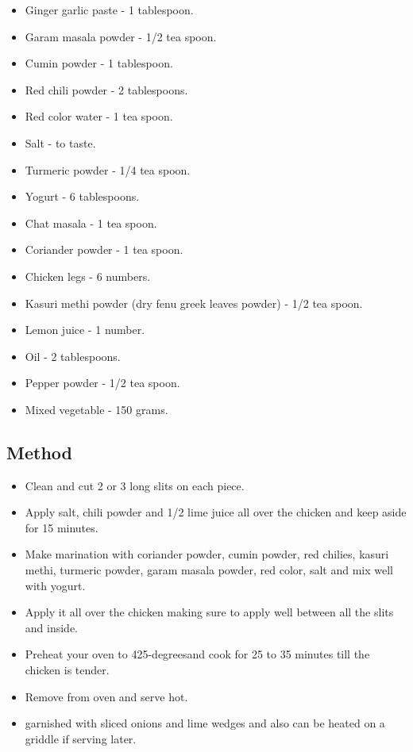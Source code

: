 \documentclass[]{article}
\providecommand{\tightlist}{%
  \setlength{\itemsep}{0pt}\setlength{\parskip}{0pt}}
\begin{document}
\begin{itemize}
\tightlist
\item
  Ginger garlic paste - 1 tablespoon.
\item
  Garam masala powder - 1/2 tea spoon.
\item
  Cumin powder - 1 tablespoon.
\item
  Red chili powder - 2 tablespoons.
\item
  Red color water - 1 tea spoon.
\item
  Salt - to taste.
\item
  Turmeric powder - 1/4 tea spoon.
\item
  Yogurt - 6 tablespoons.
\item
  Chat masala - 1 tea spoon.
\item
  Coriander powder - 1 tea spoon.
\item
  Chicken legs - 6 numbers.
\item
  Kasuri methi powder (dry fenu greek leaves powder) - 1/2 tea spoon.
\item
  Lemon juice - 1 number.
\item
  Oil - 2 tablespoons.
\item
  Pepper powder - 1/2 tea spoon.
\item
  Mixed vegetable - 150 grams.
\end{itemize}

\hypertarget{method}{%
\subsection{Method}\label{method}}

\begin{itemize}
\tightlist
\item
  Clean and cut 2 or 3 long slits on each piece.
\item
  Apply salt, chili powder and 1/2 lime juice all over the chicken and keep aside for 15 minutes.
\item
  Make marination with coriander powder, cumin powder, red chilies, kasuri methi, turmeric powder, garam masala powder, red color, salt and mix well with yogurt.
\item
  Apply it all over the chicken making sure to apply well between all the slits and inside.
\item
  Preheat your oven to 425-degreesand cook for 25 to 35 minutes till the chicken is tender.
\item
  Remove from oven and serve hot.
\item
  garnished with sliced onions and lime wedges and also can be heated on a griddle if serving later.
\end{itemize}
\end{document}

